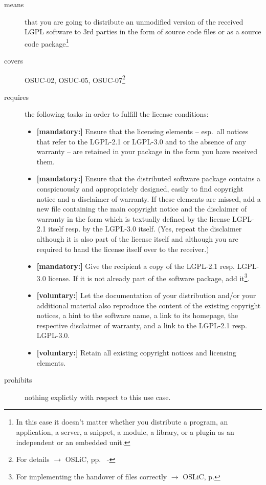 \begin{description}

\item[means] that you are going to distribute an unmodified version of the
received LGPL software to 3rd parties in the form of source code files or as a
source code package\footnote{In this case it doesn't matter whether you 
distribute a program, an application, a server, a snippet, a module, a library,
or a plugin as an independent or an embedded unit.}

\item[covers] OSUC-02, OSUC-05, OSUC-07\footnote{For details $\rightarrow$
OSLiC, pp.\ \pageref{OSUC-02-DEF} - \pageref{OSUC-07-DEF}}

\item[requires] the following tasks in order to fulfill the license conditions:
\begin{itemize}
 
  \item \textbf{[mandatory:]} Ensure that the licensing elements -- esp.\ all
  notices that refer to the LGPL-2.1 or LGPL-3.0 and to the absence of any
  warranty -- are retained in your package in the form you have received them.

  \item \textbf{[mandatory:]} Ensure that the distributed software package
  contains a conspicuously and appropriately designed, easily to find copyright
  notice and a disclaimer of warranty. If these elements are missed, add a new
  file containing the main copyright notice and the disclaimer of warranty in the
  form which is textually defined by the license LGPL-2.1 itself resp. by the
  LGPL-3.0 itself. (Yes, repeat the disclaimer although it is also part of the
  license itself and although you are required to hand the license itself over
  to the receiver.)
  
  \item \textbf{[mandatory:]} Give the recipient a copy of the LGPL-2.1 resp.
  LGPL-3.0 license. If it is not already part of the software package, add
  it\footnote{For implementing the handover of files correctly $\rightarrow$
  OSLiC, p. \pageref{DistributingFilesHint}}.
  
  \item \textbf{[voluntary:]} Let the documentation of your distribution and/or
  your additional material also reproduce the content of the existing
  copyright notices, a hint to the software name, a link to its homepage,
  the respective disclaimer of warranty, and a link to the LGPL-2.1 resp.
  LGPL-3.0.
  
  \item \textbf{[voluntary:]} Retain all existing copyright notices and
  licensing elements.
  
\end{itemize}

\item[prohibits] nothing explictly with respect to this use case.

\end{description}


